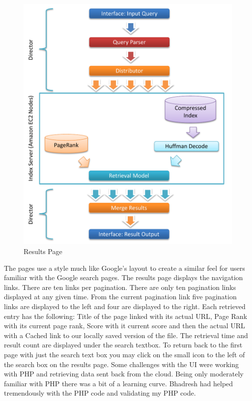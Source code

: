 \documentclass[letterpaper,11pt,twoside]{article}
\begin{document}
\begin{figure}[htbp]
 \centering
 \includegraphics[trim=0.0in 1.75in 0.0in 0.0in, clip, page=3]{Architecture.pdf}
 \caption{Results Page}
 \label{fig:result_page}
\end{figure}

The pages use a style much like Google’s layout to create a similar feel for users familiar with the Google search pages. The results page displays the navigation links. There are ten links per pagination. There are only ten pagination links displayed at any given time. From the current pagination link five pagination links are displayed to the left and four are displayed to the right. Each retrieved entry has the following: Title of the page linked with its actual URL, Page Rank with its current page rank, Score with it current score and then the actual URL with a Cached link to our locally saved version of the file. The retrieval time and result count are displayed under the search textbox. To return back to the first page with just the search text box you may click on the small icon to the left of the search box on the results page. Some challenges with the UI were working with PHP and retrieving data sent back from the cloud. Being only moderately familiar with PHP there was a bit of a learning curve. Bhadresh had helped tremendously with the PHP code and validating my PHP code. 
\end{document}
